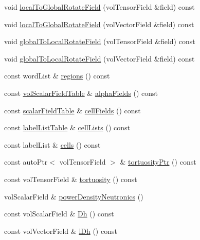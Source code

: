 \begin{DoxyCompactItemize}
void \hyperlink{classFoam_1_1structure_ada5cdb49f841dc3bb45c815efd04cf35}{local\+To\+Global\+Rotate\+Field} (vol\+Tensor\+Field \&field) const
\item 
void \hyperlink{classFoam_1_1structure_a6616ca3cfc243eaca728368b78ec58df}{local\+To\+Global\+Rotate\+Field} (vol\+Vector\+Field \&field) const
\item 
void \hyperlink{classFoam_1_1structure_a69f2ccb67163e71df8e19e59f35d70ff}{global\+To\+Local\+Rotate\+Field} (vol\+Tensor\+Field \&field) const
\item 
void \hyperlink{classFoam_1_1structure_a850fa7567fc6326932fcae9227598b3c}{global\+To\+Local\+Rotate\+Field} (vol\+Vector\+Field \&field) const
\item 
const word\+List \& \hyperlink{classFoam_1_1structure_ab0b4f2fe70836c04375a5b12d9655dd7}{regions} () const
\item 
const \hyperlink{classFoam_1_1structure_a821486e30c5f9ed2852aeddc4ff8ff30}{vol\+Scalar\+Field\+Table} \& \hyperlink{classFoam_1_1structure_aa8ba27c1f6cefdd2cf3456b668e3ebec}{alpha\+Fields} () const
\item 
const \hyperlink{classFoam_1_1structure_a2fdb5cf3126746b10e53fb86215f3249}{scalar\+Field\+Table} \& \hyperlink{classFoam_1_1structure_a130f54cdf5e2e7bc9df67ac9ab50e6d9}{cell\+Fields} () const
\item 
const \hyperlink{classFoam_1_1structure_afefd20eeb8d2675bfba9c1ce9aa78ca7}{label\+List\+Table} \& \hyperlink{classFoam_1_1structure_a5266b7f2620c92c2ebc4b161bb508dd9}{cell\+Lists} () const
\item 
const label\+List \& \hyperlink{classFoam_1_1structure_a6c52bb4668a4987505228de74f076b7b}{cells} () const
\item 
const auto\+Ptr$<$ vol\+Tensor\+Field $>$ \& \hyperlink{classFoam_1_1structure_a275cc4ad82f621e5e79286e3e8d76c32}{tortuosity\+Ptr} () const
\item 
const vol\+Tensor\+Field \& \hyperlink{classFoam_1_1structure_a37021dc7173903ecbaffef0cee5632c4}{tortuosity} () const
\item 
vol\+Scalar\+Field \& \hyperlink{classFoam_1_1structure_a2eb0a266a288909b3480c78cc83348ed}{power\+Density\+Neutronics} ()
\item 
const vol\+Scalar\+Field \& \hyperlink{classFoam_1_1structure_ac7cf53b510afce511c82e2097ea86d02}{Dh} () const
\item 
const vol\+Vector\+Field \& \hyperlink{classFoam_1_1structure_a1cc5649e59ac6459f9dc1bbdf7c2de22}{l\+Dh} () const
\item 

\end{DoxyCompactItemize}
